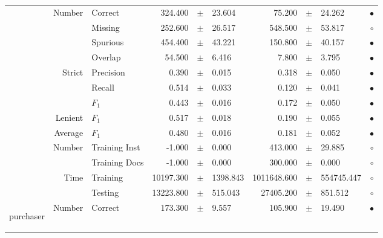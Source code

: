 \begin{longtable}{|r|r|l||rcl|rcl|c|}
& \multirow{4}{*}{    Number} &         Correct &     324.400 &  $\pm$  &      23.604 &      75.200 &  $\pm$  &      24.262 & $\bullet$ \\
&                             &         Missing &     252.600 &  $\pm$  &      26.517 &     548.500 &  $\pm$  &      53.817 & $\circ$ \\
&                             &        Spurious &     454.400 &  $\pm$  &      43.221 &     150.800 &  $\pm$  &      40.157 & $\bullet$ \\
&                             &         Overlap &      54.500 &  $\pm$  &       6.416 &       7.800 &  $\pm$  &       3.795 & $\bullet$ \\
& \multirow{3}{*}{    Strict} &       Precision &       0.390 &  $\pm$  &       0.015 &       0.318 &  $\pm$  &       0.050 & $\bullet$ \\
&                             &          Recall &       0.514 &  $\pm$  &       0.033 &       0.120 &  $\pm$  &       0.041 & $\bullet$ \\
&                             &           $F_1$ &       0.443 &  $\pm$  &       0.016 &       0.172 &  $\pm$  &       0.050 & $\bullet$ \\
&                     Lenient &           $F_1$ &       0.517 &  $\pm$  &       0.018 &       0.190 &  $\pm$  &       0.055 & $\bullet$ \\
&                     Average &           $F_1$ &       0.480 &  $\pm$  &       0.016 &       0.181 &  $\pm$  &       0.052 & $\bullet$ \\
& \multirow{2}{*}{    Number} &   Training Inst &      -1.000 &  $\pm$  &       0.000 &     413.000 &  $\pm$  &      29.885 & $\circ$ \\
&                             &   Training Docs &      -1.000 &  $\pm$  &       0.000 &     300.000 &  $\pm$  &       0.000 & $\circ$ \\
& \multirow{2}{*}{      Time} &        Training &   10197.300 &  $\pm$  &    1398.843 & 1011648.600 &  $\pm$  &  554745.447 & $\circ$ \\
&                             &         Testing &   13223.800 &  $\pm$  &     515.043 &   27405.200 &  $\pm$  &     851.512 & $\circ$ \\
\hline
\hline
\multirow{11}{*}{\begin{sideways}purchaser\end{sideways} }
& \multirow{4}{*}{    Number} &         Correct &     173.300 &  $\pm$  &       9.557 &     105.900 &  $\pm$  &      19.490 & $\bullet$ \\

\end{longtable}
